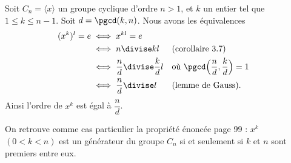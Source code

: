 Soit $C_n=\langle x \rangle$ un groupe cyclique d'ordre $n>1$, et $k$ un entier
tel que $1\leqslant k\leqslant n-1$. Soit $d = \pgcd(k,n)$. Nous avons les
équivalences
%
\begin{align*}
  (x^k)^l = e
  &\iff x^{kl} = e \\
  &\iff n \divise kl && \text{(corollaire 3.7)} \\
  &\iff \frac{n}{d} \divise \frac{k}{d}l
    && \text{où $\pgcd\Bigl(\frac{n}{d},\frac{k}{d}\Bigr) = 1$}\\
  &\iff \frac{n}{d} \divise l && \text{(lemme de Gauss).}
\end{align*}
%
Ainsi l'ordre de $x^k$ est égal à $\dfrac{n}{d}$.

\begin{remarque}
  On retrouve comme cas particulier la propriété énoncée page 99 : $x^k$ $(0< k<n)$ est un générateur du
  groupe $C_n$ si et seulement si $k$ et $n$ sont premiers entre eux.
\end{remarque}
